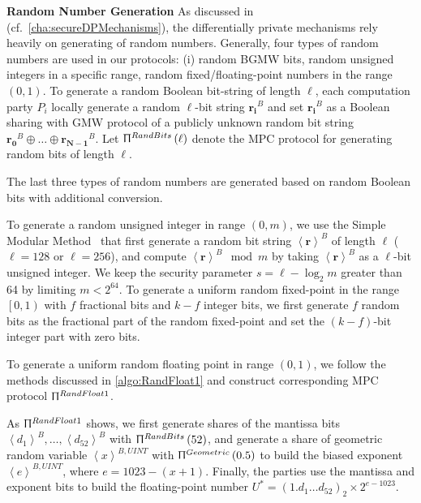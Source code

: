 \textbf{Random Number Generation}
As discussed in (cf.~\autoref{cha:secureDPMechanisms}), the differentially private mechanisms rely heavily on generating of random numbers.
Generally, four types of random numbers are used in our protocols: (i) random BGMW bits, random unsigned integers in a specific range, random fixed/floating-point numbers in the range $\left(0,1\right) $.
To generate a random Boolean bit-string of length $\ell$, each computation party $P_i$ locally generate a random $\ell$-bit string $\boldsymbol{r_i}^B$ and set $\boldsymbol{r_i}^B$ as a Boolean sharing with GMW protocol of a publicly unknown random bit string $\boldsymbol{r_0}^B \oplus \ldots \oplus \boldsymbol{r_{N-1}}^B $. Let $\Uppi^{RandBits}\left(\ell\right) $ denote the MPC protocol for generating random bits of length $\ell$.

The last three types of random numbers are generated based on random Boolean bits with additional conversion.

To generate a random unsigned integer in range $\left(0,m\right) $, we use the Simple Modular Method~\cite{NISTRandomNumber2015} that first generate a random bit string $\left\langle \boldsymbol{r}\right\rangle^B $ of length $\ell$ ($\ell=128$ or $\ell=256$), and compute $ \left\langle \boldsymbol{r}\right\rangle^B \mod m$ by taking $\left\langle \boldsymbol{r}\right\rangle^B $ as a $\ell$-bit unsigned integer. We keep the security parameter $s=\ell-\log_2 m$ greater than 64 by limiting $m<2^{64}$.
To generate a uniform random fixed-point in the range $\left[0,1\right)$ with $f$ fractional bits and $k-f$ integer bits, we first generate $f$ random bits as the fractional part of the random fixed-point and set the $\left(k-f\right) $-bit integer part with zero bits.

                  To generate a uniform random floating point in range $\left(0,1\right) $, we follow the methods discussed in \autoref{algo:RandFloat1} and construct corresponding MPC protocol $\Uppi^{RandFloat1}$.

                  As $\Uppi^{RandFloat1}$ shows, we first generate shares of the mantissa bits $\left\langle d_{1}\right\rangle^{B}, \ldots ,\left\langle d_{52}\right\rangle ^{B} $ with $\Uppi^{RandBits}\left(52\right) $, and generate a share of geometric random variable $\left\langle {x}\right\rangle^{B,UINT} $ with $\Uppi^{Geometric}\left(0.5\right) $ to build the biased exponent $\left\langle {e}\right\rangle^{B,UINT}$, where $e=1023-\left(x+1\right) $. Finally, the parties use the mantissa and exponent bits to build the floating-point number $U^{*}=\left(1.d_{1} \ldots d_{52}\right)_{2} \times 2^{e -1023} $.

